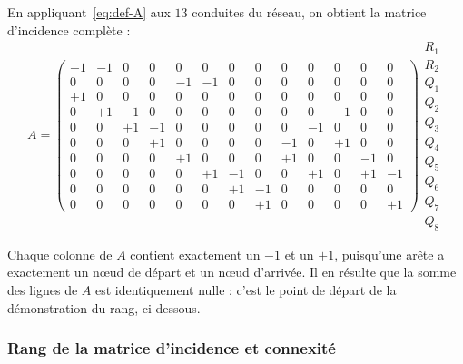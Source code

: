 \documentclass[11pt]{ama-article}
\begin{document}
En appliquant~\eqref{eq:def-A} aux $13$ conduites du réseau, on obtient la matrice d'incidence
complète :
\begin{equation}
A =
\begin{pmatrix}
-1 & -1 &  0 &  0 &  0 &  0 &  0 &  0 &  0 &  0 &  0 &  0 &  0 \\
 0 &  0 &  0 &  0 & -1 & -1 &  0 &  0 &  0 &  0 &  0 &  0 &  0 \\
+1 &  0 &  0 &  0 &  0 &  0 &  0 &  0 &  0 &  0 &  0 &  0 &  0 \\
 0 & +1 & -1 &  0 &  0 &  0 &  0 &  0 &  0 &  0 & -1 &  0 &  0 \\
 0 &  0 & +1 & -1 &  0 &  0 &  0 &  0 &  0 & -1 &  0 &  0 &  0 \\
 0 &  0 &  0 & +1 &  0 &  0 &  0 &  0 & -1 &  0 & +1 &  0 &  0 \\
 0 &  0 &  0 &  0 & +1 &  0 &  0 &  0 & +1 &  0 &  0 & -1 &  0 \\
 0 &  0 &  0 &  0 &  0 & +1 & -1 &  0 &  0 & +1 &  0 & +1 & -1 \\
 0 &  0 &  0 &  0 &  0 &  0 & +1 & -1 &  0 &  0 &  0 &  0 &  0 \\
 0 &  0 &  0 &  0 &  0 &  0 &  0 & +1 &  0 &  0 &  0 &  0 & +1
\end{pmatrix}
\begin{array}{l}
R_1 \\ R_2 \\ Q_1 \\ Q_2 \\ Q_3 \\ Q_4 \\ Q_5 \\ Q_6 \\ Q_7 \\ Q_8
\end{array}
\label{eq:matrice-A}
\end{equation}

\begin{remarque}
Chaque colonne de $A$ contient exactement un $-1$ et un $+1$, puisqu'une arête a exactement un
nœud de départ et un nœud d'arrivée. Il en résulte que la somme des lignes de $A$ est
identiquement nulle : c'est le point de départ de la démonstration du rang, ci-dessous.
\end{remarque}

\subsubsection{Rang de la matrice d'incidence et connexité}
\label{sec:rang}
\end{document}
